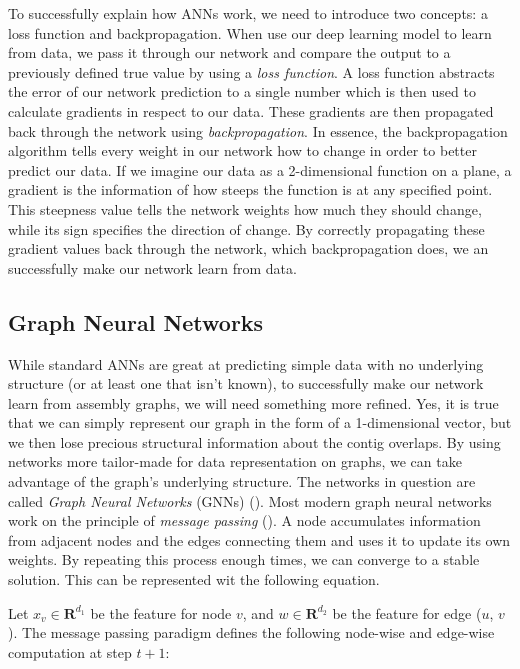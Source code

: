 \documentclass[times, utf8, diplomski, english]{fer_eng}
\begin{document}
To successfully explain how ANNs work, we need to introduce two concepts: a loss function and backpropagation. When use our deep learning model to learn from data, we pass it through our network and compare the output to a previously defined true value by using a \textit{loss function}. A loss function abstracts the error of our network prediction to a single number which is then used to calculate gradients in respect to our data. These gradients are then propagated back through the network using \textit{backpropagation}. In essence, the backpropagation algorithm tells every weight in our network how to change in order to better predict our data. If we imagine our data as a 2-dimensional function on a plane, a gradient is the information of how steeps the function is at any specified point. This steepness value tells the network weights how much they should change, while its sign specifies the direction of change. By correctly propagating these gradient values back through the network, which backpropagation does, we an successfully make our network learn from data.

\subsection{Graph Neural Networks}

While standard ANNs are great at predicting simple data with no underlying structure (or at least one that isn't known), to successfully make our network learn from assembly graphs, we will need something more refined. Yes, it is true that we can simply represent our graph in the form of a 1-dimensional vector, but we then lose precious structural information about the contig overlaps. By using networks more tailor-made for data representation on graphs, we can take advantage of the graph's underlying structure. The networks in question are called \textit{Graph Neural Networks} (GNNs) (\cite{GNN}). Most modern graph neural networks work on the principle of \textit{message passing} (\cite{message_passing}). A node accumulates information from adjacent nodes and the edges connecting them and uses it to update its own weights. By repeating this process enough times, we can converge to a stable solution. This can be represented wit the following equation.


Let $x_v \in \mathbf{R}^{d_1}$ be the feature for node $v$, and $w \in \mathbf{R}^{d_2}$ be the feature for edge ($u$, $v$). The message passing paradigm defines the following node-wise and edge-wise computation at step $t+1$:
\end{document}
